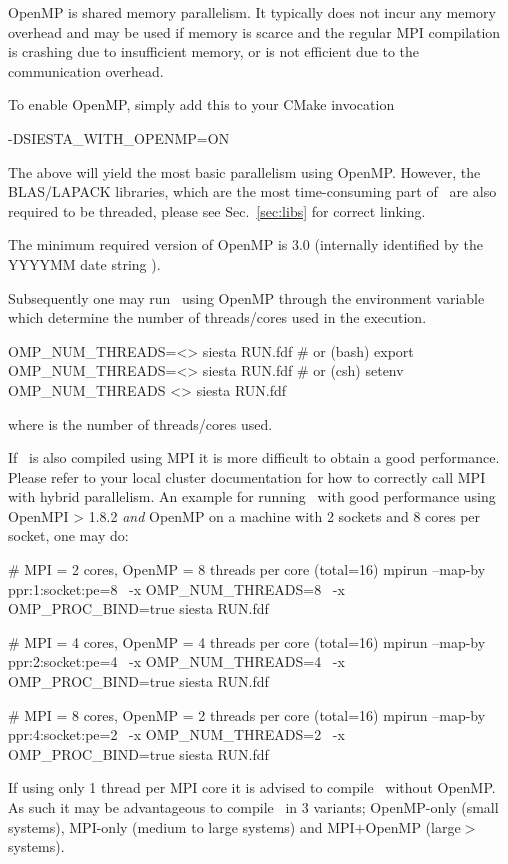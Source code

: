 OpenMP is shared memory parallelism. It typically does not incur any
memory overhead and may be used if memory is scarce and the regular
MPI compilation is crashing due to insufficient memory, or is not
efficient due to the communication overhead.

To enable OpenMP, simply add this to your CMake invocation
\begin{shellexample}
  -DSIESTA_WITH_OPENMP=ON
\end{shellexample}

The above will yield the most basic parallelism using OpenMP. However,
the BLAS/LAPACK libraries, which are the most time-consuming part of
\siesta\ are also required to be threaded, please see Sec.~\ref{sec:libs}
for correct linking.

The minimum required version of OpenMP is 3.0
(internally identified by the YYYYMM date string ).

Subsequently one may run \siesta\ using OpenMP through the environment
variable  which determine the number of
threads/cores used in the execution.
\begin{shellexample}
  OMP_NUM_THREADS=<> siesta RUN.fdf
  # or (bash)
  export OMP_NUM_THREADS=<>
  siesta RUN.fdf
  # or (csh)
  setenv OMP_NUM_THREADS <>
  siesta RUN.fdf
\end{shellexample}
where \shell{<>} is the number of threads/cores used.

If \siesta\ is also compiled using MPI it is more difficult to obtain
a good performance. Please refer to your local cluster documentation for how to
correctly call MPI with hybrid parallelism.
%
An example for running \siesta\ with good performance using OpenMPI >
1.8.2 \emph{and} OpenMP on a machine with 2 sockets and 8 cores per
socket, one may do:
\begin{shellexample}
  # MPI = 2 cores, OpenMP = 8 threads per core (total=16)
  mpirun --map-by ppr:1:socket:pe=8 \
     -x OMP_NUM_THREADS=8 \
     -x OMP_PROC_BIND=true siesta RUN.fdf

  # MPI = 4 cores, OpenMP = 4 threads per core (total=16)
  mpirun --map-by ppr:2:socket:pe=4 \
     -x OMP_NUM_THREADS=4 \
     -x OMP_PROC_BIND=true siesta RUN.fdf

  # MPI = 8 cores, OpenMP = 2 threads per core (total=16)
  mpirun --map-by ppr:4:socket:pe=2 \
     -x OMP_NUM_THREADS=2 \
     -x OMP_PROC_BIND=true siesta RUN.fdf
\end{shellexample}
If using only 1 thread per MPI core it is advised to compile \siesta\
without OpenMP. As such it may be advantageous to compile \siesta\ in
3 variants; OpenMP-only (small systems), MPI-only (medium to large
systems) and MPI$+$OpenMP (large$>$ systems).

